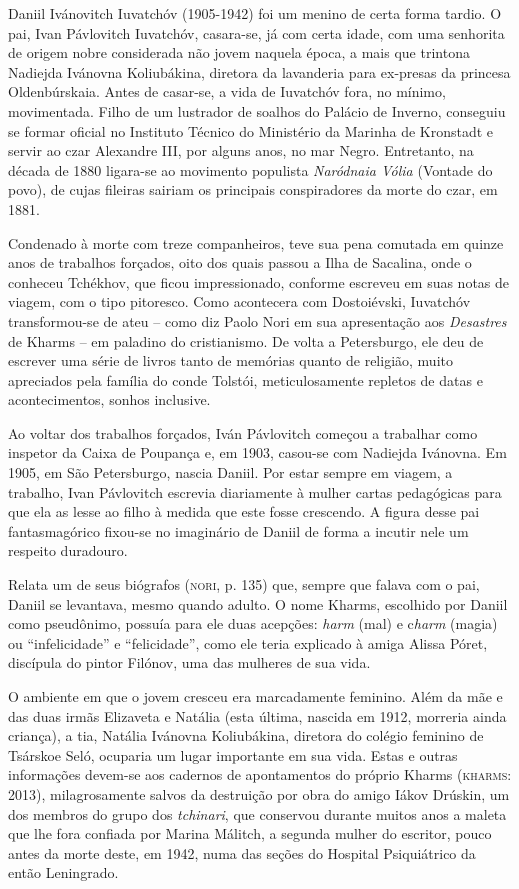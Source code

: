 Daniil Ivánovitch Iuvatchóv (1905-1942) foi um menino de certa forma
tardio. O pai, Ivan Pávlovitch Iuvatchóv, casara-se, já com certa idade,
com uma senhorita de origem nobre considerada não jovem naquela época, a
mais que trintona Nadiejda Ivánovna Koliubákina, diretora da lavanderia
para ex-presas da princesa Oldenbúrskaia. Antes de casar-se, a vida de
Iuvatchóv fora, no mínimo, movimentada. Filho de um lustrador de soalhos
do Palácio de Inverno, conseguiu se formar oficial no Instituto Técnico
do Ministério da Marinha de Kronstadt e servir ao czar Alexandre III,
por alguns anos, no mar Negro. Entretanto, na década de 1880 ligara-se
ao movimento populista \emph{Naródnaia Vólia} (Vontade do povo), de
cujas fileiras sairiam os principais conspiradores da morte do czar, em
1881.

Condenado à morte com treze companheiros, teve sua pena comutada em
quinze anos de trabalhos forçados, oito dos quais passou a Ilha de
Sacalina, onde o conheceu Tchékhov, que ficou impressionado, conforme
escreveu em suas notas de viagem, com o tipo pitoresco. Como acontecera
com Dostoiévski, Iuvatchóv transformou-se de ateu -- como diz Paolo Nori
em sua apresentação aos \emph{Desastres} de Kharms -- em paladino do
cristianismo. De volta a Petersburgo, ele deu de escrever uma série de
livros tanto de memórias quanto de religião, muito apreciados pela
família do conde Tolstói, meticulosamente repletos de datas e
acontecimentos, sonhos inclusive.

Ao voltar dos trabalhos forçados, Iván Pávlovitch começou a trabalhar
como inspetor da Caixa de Poupança e, em 1903, casou-se com Nadiejda
Ivánovna. Em 1905, em São Petersburgo, nascia Daniil. Por estar sempre
em viagem, a trabalho, Ivan Pávlovitch escrevia diariamente à mulher
cartas pedagógicas para que ela as lesse ao filho à medida que este
fosse crescendo. A figura desse pai fantasmagórico fixou-se no
imaginário de Daniil de forma a incutir nele um respeito duradouro.

Relata um de seus biógrafos (\textsc{nori}, p. 135) que, sempre que
falava com o pai, Daniil se levantava, mesmo quando adulto. O nome
Kharms, escolhido por Daniil como pseudônimo, possuía para ele duas
acepções: \emph{harm} (mal) e c\emph{harm} (magia) ou ``infelicidade'' e
``felicidade'', como ele teria explicado à amiga Alissa Póret, discípula
do pintor Filónov, uma das mulheres de sua vida.

O ambiente em que o jovem cresceu era marcadamente feminino. Além da mãe
e das duas irmãs Elizaveta e Natália (esta última, nascida em 1912,
morreria ainda criança), a tia, Natália Ivánovna Koliubákina, diretora
do colégio feminino de Tsárskoe Seló, ocuparia um lugar importante em
sua vida. Estas e outras informações devem-se aos cadernos de
apontamentos do próprio Kharms (\textsc{kharms}: 2013), milagrosamente
salvos da destruição por obra do amigo Iákov Drúskin, um dos membros do
grupo dos \emph{tchinari}, que conservou durante muitos anos a maleta
que lhe fora confiada por Marina Málitch, a segunda mulher do escritor,
pouco antes da morte deste, em 1942, numa das seções do Hospital
Psiquiátrico da então Leningrado.

